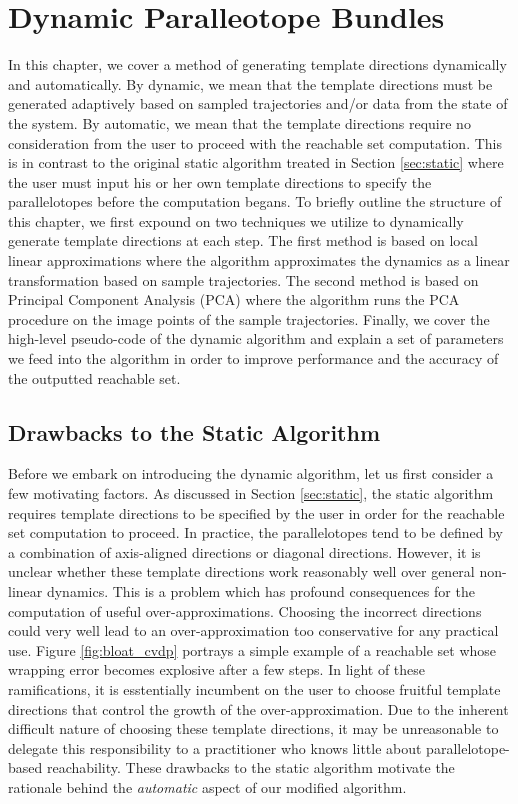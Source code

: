 \chapter{Dynamic Paralleotope Bundles}

In this chapter, we cover a method of generating template directions dynamically and automatically.
%
By dynamic, we mean that the template directions must be generated adaptively based on sampled trajectories and/or data from the state of the system.
%
By automatic, we mean that the template directions require no consideration from the user to proceed with the reachable set computation. This is in contrast to the original static algorithm treated in Section \ref{sec:static} where the user must input his or her own template directions to specify the parallelotopes before the computation begans.
%
To briefly outline the structure of this chapter, we first expound on two techniques we utilize to dynamically generate template directions at each step.
%
The first method is based on local linear approximations where the algorithm approximates the dynamics as a linear transformation based on sample trajectories.
%
The second method is based on Principal Component Analysis (PCA) where the algorithm runs the PCA procedure on the image points of the sample trajectories.
%
Finally, we cover the high-level pseudo-code of the dynamic algorithm and explain a set of parameters we feed into the algorithm in order to improve performance and the accuracy of the outputted reachable set.



\section{Drawbacks to the Static Algorithm}
Before we embark on introducing the dynamic algorithm, let us first consider a few motivating factors.
%
As discussed in Section \ref{sec:static}, the static algorithm requires template directions to be specified by the user in order for the reachable set computation to proceed.
%
In practice, the parallelotopes tend to be defined by a combination of axis-aligned directions or diagonal directions.
%
However, it is unclear whether these template directions work reasonably well over general non-linear dynamics.
%
This is a problem which has profound consequences for the computation of useful over-approximations.
%
Choosing the incorrect directions could very well lead to an over-approximation too conservative for any practical use.
%
Figure \ref{fig:bloat_cvdp} portrays a simple example of a reachable set whose wrapping error becomes explosive after a few steps.
%
In light of these ramifications, it is esstentially incumbent on the user to choose fruitful template directions that control the growth of the over-approximation.
%
Due to the inherent difficult nature of choosing these template directions, it may be unreasonable to delegate this responsibility to a practitioner who knows little about parallelotope-based reachability.
%
These drawbacks to the static algorithm motivate the rationale behind the \emph{automatic} aspect of our modified algorithm.

